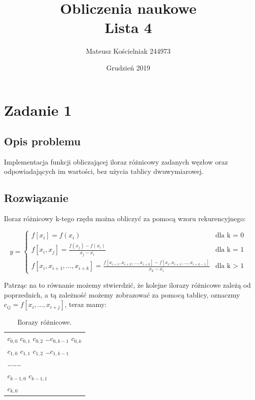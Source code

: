 \documentclass[12pt, a4paper]{article}
\title{\textbf{Obliczenia naukowe\\Lista 4}}
\author{Mateusz Kościelniak 244973\\}
\date{Grudzień 2019}
\begin{document}
\maketitle

\newpage

\section{Zadanie 1}
\subsection{Opis problemu}
Implementacja funkcji obliczającej iloraz różnicowy zadanych węzłow oraz odpowiadających im wartości, bez użycia tablicy dwuwymiarowej. 
\subsection{Rozwiązanie}
Iloraz różnicowy k-tego rzędu można obliczyć za pomocą wzoru rekurencyjnego:

$$
y = \left\{ \begin{array}{ll}
f[x_i]=f(x_i) & \textrm{dla k = 0}\\
f[x_i,x_j] = \frac{f(x_j) - f(x_i)}{x_j - x_i} & \textrm{dla k = 1}\\
f[x_i,x_{i+1}, \ldots, x_{i+k}] = \frac{f[x_{i+1},x_{i+2}, \ldots, x_{i+k}] - f[x_{i}, x_{i+1}, \ldots, x_{i+k-1}]}{x_k - x_i} & \textrm{dla k > 1}
\end{array} \right.
$$

Patrząc na to równanie możemy stwierdzić, że kolejne ilorazy różnicowe zależą od poprzednich, a  tą zależność możemy zobrazować za pomocą tablicy, oznaczmy  
$c_{ij} = f[x_i, \ldots, x_{i+j}]$, teraz mamy:

\begin{table}[h]
        \centering
        \footnotesize
        \renewcommand{\arraystretch}{1.5}
\begin{tabular}{l} 
$c_{0,0} $ \quad $c_{0,1}$ \quad $c_{0,2}$ \quad \ldots \quad $c_{0,k-1}$ \quad $c_{0,k}$ \\
$c_{1,0} $ \quad $c_{1,1}$ \quad $c_{1,2}$ \quad \ldots \quad $c_{1,k-1}$ \\
\ldots \quad \ldots \quad \ldots \\
$c_{k-1,0}$ \quad $c_{k-1,1}$ \\
$c_{k,0}$ \\
\end{tabular}
\caption{Ilorazy różnicowe.}
\end{table}
\end{document}
